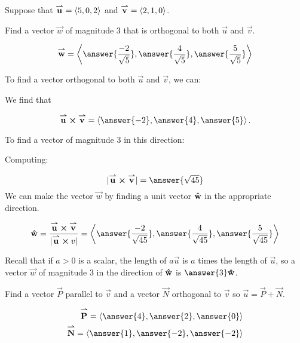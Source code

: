 \documentclass{ximera}
\author{Jim Talamo}
\begin{document}
\begin{exercise}
Suppose that ${\overset{\boldsymbol{\rightharpoonup}}{\mathbf{u}}} = \left\langle 5,0,2\right\rangle$ and ${\overset{\boldsymbol{\rightharpoonup}}{\mathbf{v}}} = \left\langle 2,1,0\right\rangle$.  

Find a vector $\vec{w}$ of magnitude 3 that is orthogonal to both $\vec{u}$ and $\vec{v}$.

\[
\vec{w} = \vector{ \answer{\frac{-2}{\sqrt{5}}},\answer{\frac{4}{\sqrt{5}}}, \answer{\frac{5}{\sqrt{5}}}   }
\]


\begin{hint}
To find a vector orthogonal to both $\vec{u}$ and $\vec{v}$, we can:

\begin{multipleChoice}
\end{multipleChoice}

We find that

\[
\vec{u} \cross \vec{v} = \vector{\answer{-2},\answer{4},\answer{5}}.
\]

To find a vector of magnitude 3 in this direction:

\begin{multipleChoice}
\end{multipleChoice}

Computing:

\[
|\vec{u} \cross \vec{v} | = \answer{\sqrt{45}}
\]
We can make the vector $\vec{w}$ by finding a unit vector $\mathbf{\hat{w}}$ in the appropriate direction.

\[
\uvec{w} = \frac{\vec{u} \cross \vec{v}}{|\vec{u} \cross{v}|} = \vector{ \answer{\frac{-2}{\sqrt{45}}},\answer{\frac{4}{\sqrt{45}}}, \answer{\frac{5}{\sqrt{45}}}   }
\]

Recall that if $a>0$ is a scalar, the length of $a\vec{u}$ is $a$ times the length of $\vec{u}$, so a vector $\vec{w}$ of magnitude 3 in the direction of $\mathbf{\hat{w}}$ is $\answer{3}\uvec{w}$. 
\end{hint}

\begin{exercise}
Find a vector $\vec{P}$ parallel to $\vec{v}$ and a vector $\vec{N}$ orthogonal to $\vec{v}$ so $\vec{u} = \vec{P} +\vec{N}$.

\begin{align*}
\vec{P} = \vector{\answer{4},\answer{2}, \answer{0}} \\
\vec{N}= \vector{\answer{1},\answer{-2},\answer{-2}} \\
\end{align*} 


\end{exercise}
\end{exercise}
\end{document}
